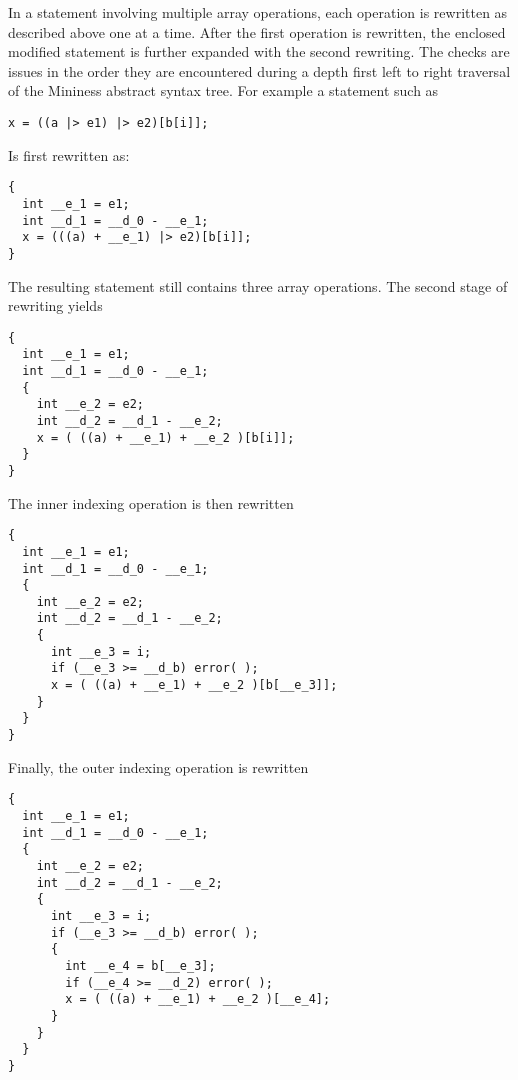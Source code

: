 In a statement involving multiple array operations, each operation is rewritten as described
above one at a time. After the first operation is rewritten, the enclosed modified statement is
further expanded with the second rewriting. The checks are issues in the order they are
encountered during a depth first left to right traversal of the Mininess abstract syntax tree.
For example a statement such as

\singlespace
\begin{lstlisting}[language=nesC]
x = ((a |> e1) |> e2)[b[i]];
\end{lstlisting}
\primaryspacing

Is first rewritten as:

\singlespace
\begin{lstlisting}[language=nesC]
{
  int __e_1 = e1;
  int __d_1 = __d_0 - __e_1;
  x = (((a) + __e_1) |> e2)[b[i]];
}
\end{lstlisting}
\primaryspacing

The resulting statement still contains three array operations. The second stage of rewriting
yields

\singlespace
\begin{lstlisting}[language=nesC]
{
  int __e_1 = e1;
  int __d_1 = __d_0 - __e_1;
  {
    int __e_2 = e2;
    int __d_2 = __d_1 - __e_2;
    x = ( ((a) + __e_1) + __e_2 )[b[i]];
  }
}
\end{lstlisting}
\primaryspacing

The inner indexing operation is then rewritten

\singlespace
\begin{lstlisting}[language=nesC]
{
  int __e_1 = e1;
  int __d_1 = __d_0 - __e_1;
  {
    int __e_2 = e2;
    int __d_2 = __d_1 - __e_2;
    {
      int __e_3 = i;
      if (__e_3 >= __d_b) error( );
      x = ( ((a) + __e_1) + __e_2 )[b[__e_3]];
    }
  }
}
\end{lstlisting}
\primaryspacing

Finally, the outer indexing operation is rewritten

\singlespace
\begin{lstlisting}[language=nesC]
{
  int __e_1 = e1;
  int __d_1 = __d_0 - __e_1;
  {
    int __e_2 = e2;
    int __d_2 = __d_1 - __e_2;
    {
      int __e_3 = i;
      if (__e_3 >= __d_b) error( );
      {
        int __e_4 = b[__e_3];
        if (__e_4 >= __d_2) error( );
        x = ( ((a) + __e_1) + __e_2 )[__e_4];
      }
    }
  }
}
\end{lstlisting}
\primaryspacing

